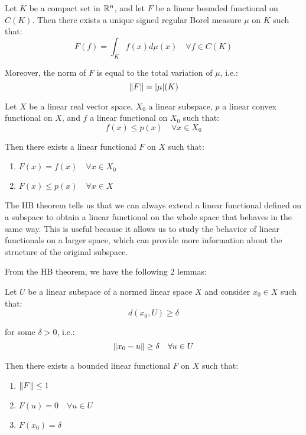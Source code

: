 \begin{theorem}
    Let $K$ be a compact set in $\mathbb{R}^n$, and let $F$ be a linear bounded functional on $C(K)$.
    Then there exists a unique signed regular Borel measure $\mu$ on $K$ such that:
    $$F(f) = \int_K f(x) d\mu(x) \quad \forall f \in C(K)$$

    Moreover, the norm of $F$ is equal to the total variation of $\mu$, i.e.:
    $$\left\|F\right\| = |\mu|(K)$$
\end{theorem}

\begin{theorem}
    Let $X$ be a linear real vector space, $X_0$ a linear subspace, $p$ a linear 
    convex functional on $X$, and $f$ a linear functional on $X_0$ such that:
    $$f(x) \leq p(x) \quad \forall x \in X_0$$

    Then there exists a linear functional $F$ on $X$ such that:
    \begin{enumerate}[label=(\roman*)]
        \item $F(x) = f(x) \quad \forall x \in X_0$
        \item $F(x) \leq p(x) \quad \forall x \in X$
    \end{enumerate}
\end{theorem}

\begin{remark}
    The HB theorem tells us that we can always extend a linear functional defined on a 
    subspace to obtain a linear functional on the whole space that behaves in the same way.
    This is useful because it allows us to study the behavior of linear functionals on a 
    larger space, which can provide more information about the structure of the original 
    subspace.
\end{remark}

From the HB theorem, we have the following 2 lemmas:

\begin{lemma}
    Let $U$ be a linear subspace of a normed linear space $X$ and consider $x_0 \in X$
    such that:
    $$d(x_0, U) \geq \delta$$

    for some $\delta > 0$, i.e.:
    $$\left\|x_0 - u\right\| \geq \delta \quad \forall u \in U$$
    
    Then there exists a bounded linear functional $F$ on $X$ such that:
    \begin{enumerate}[label=(\roman*)]
        \item $\left\|F\right\| \leq 1$
        \item $F(u) = 0 \quad \forall u \in U$
        \item $F(x_0) = \delta$
    \end{enumerate}
\end{lemma}

